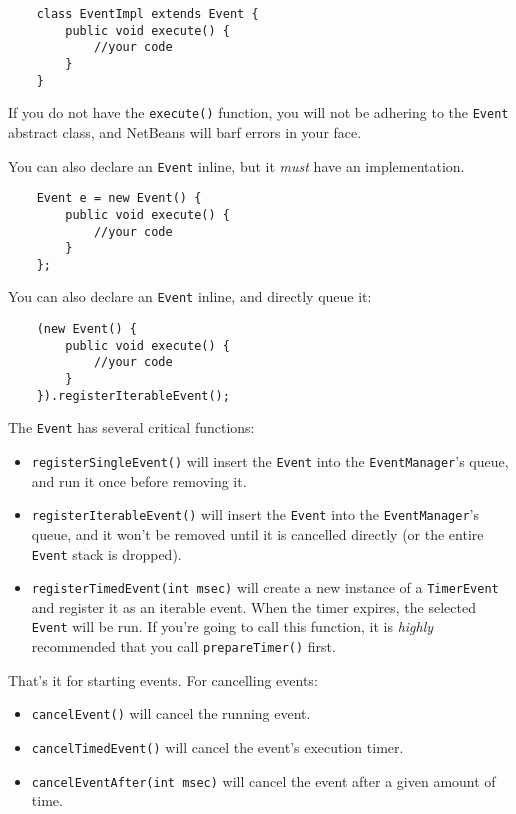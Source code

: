 \documentclass[a4paper]{article}
\begin{document}
\begin{verbatim}
	class EventImpl extends Event {
		public void execute() {
			//your code
		}
	}
\end{verbatim}

If you do not have the \lstinline{execute()} function, you will not be adhering to the \lstinline{Event} abstract class, and NetBeans will barf errors in your face.

You can also declare an \lstinline{Event} inline, but it \textit{must} have an implementation.

\begin{verbatim}
	Event e = new Event() {
		public void execute() {
			//your code
		}
	};
\end{verbatim}

You can also declare an \lstinline{Event} inline, and directly queue it:

\begin{verbatim}
	(new Event() {
		public void execute() {
			//your code
		}
	}).registerIterableEvent();
\end{verbatim}

The \lstinline{Event} has several critical functions:
\begin{itemize}\item{\lstinline{registerSingleEvent()} will insert the \lstinline{Event} into the \lstinline{EventManager}'s queue, and run it once before removing it.}\item{\lstinline{registerIterableEvent()} will insert the \lstinline{Event} into the \lstinline{EventManager}'s queue, and it won't be removed until it is cancelled directly (or the entire \lstinline{Event} stack is dropped).}\item{\lstinline{registerTimedEvent(int msec)} will create a new instance of a \lstinline{TimerEvent} and register it as an iterable event. When the timer expires, the selected \lstinline{Event} will be run. If you're going to call this function, it is \textit{highly} recommended that you call \lstinline{prepareTimer()} first.}\end{itemize}

That's it for starting events. For cancelling events: \begin{itemize}\item{\lstinline{cancelEvent()} will cancel the running event.}\item{\lstinline{cancelTimedEvent()} will cancel the event's execution timer.}\item{\lstinline{cancelEventAfter(int msec)} will cancel the event after a given amount of time.}\end{itemize}
\end{document}
